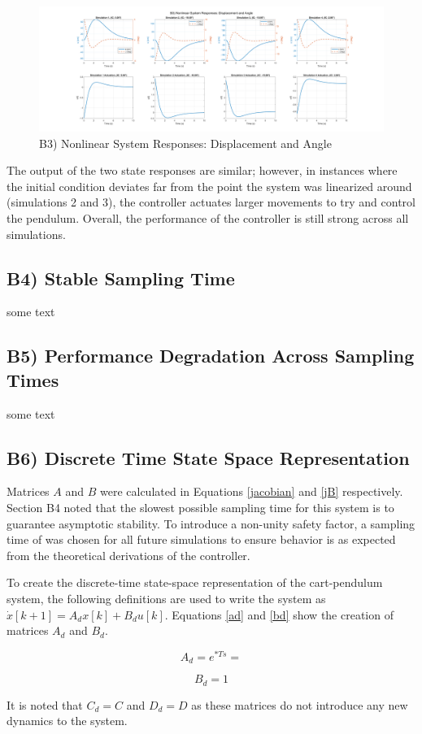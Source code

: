 \documentclass{article}
\begin{document}
\begin{figure}[H]
    \centering
    \includegraphics[width=\textwidth]{figures/b3_x.png}
    \caption{B3) Nonlinear System Responses: Displacement and Angle}
    \label{B3}
\end{figure}

The output of the two state responses are similar; however, in instances where the initial condition deviates far from the point the system was linearized around (simulations 2 and 3), the controller actuates larger movements to try and control the pendulum. Overall, the performance of the controller is still strong across all simulations.

\subsection*{B4) Stable Sampling Time}

some text

\subsection*{B5) Performance Degradation Across Sampling Times}

some text

\subsection*{B6) Discrete Time State Space Representation}
Matrices $A$ and $B$ were calculated in Equations \ref{jacobian} and \ref{jB} respectively. Section B4 noted that the slowest possible sampling time for this system is to guarantee asymptotic stability. To introduce a non-unity safety factor, a sampling time of  was chosen for all future simulations to ensure behavior is as expected from the theoretical derivations of the controller.

To create the discrete-time state-space representation of the cart-pendulum system, the following definitions are used to write the system as $\dot x[k+1]=A_dx[k]+B_du[k]$. Equations \ref{ad} and \ref{bd} show the creation of matrices $A_d$ and $B_d$.

\begin{equation}\label{ad}
    A_d=e^{*Ts}=
\end{equation}


\begin{equation}\label{Bd}
    B_d=1
\end{equation}

It is noted that $C_d=C$ and $D_d=D$ as these matrices do not introduce any new dynamics to the system.
\end{document}
